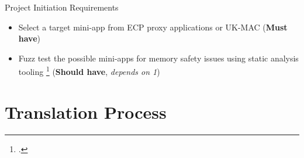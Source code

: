 \documentclass[10pt,aspectratio=169]{beamer}
\newcommand{\cmark}{\ding{51}}
\newcommand{\done}{\rlap{$\square$}{\raisebox{2pt}{\large\hspace{1pt}\textcolor{green}{\cmark}}}\hspace{-2.5pt}}
\begin{document}
\begin{frame}{Project Initiation Requirements}
    \begin{itemize}
        \item[\done\ \ 1.]
          Select a target mini-app from ECP proxy applications or UK-MAC
          (\textbf{Must have})
        \item[\done\ \ 2.]
          Fuzz test the possible mini-apps for memory safety issues using static analysis tooling \footcite{stepanovMemorySanitizerFastDetector2015}
          (\textbf{Should have}, \textit{depends on 1})
    \end{itemize}
\end{frame}
    






\section{Translation Process}
\end{document}
